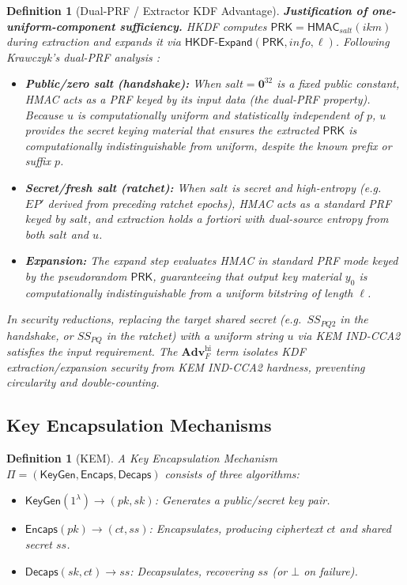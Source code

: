 \documentclass[11pt,a4paper]{article}
\newtheorem{definition}[theorem]{Definition}
\theoremstyle{remark}
\theoremstyle{plain}
\newcommand{\Adv}{\mathbf{Adv}}
\newcommand{\Encaps}{\mathsf{Encaps}}
\newcommand{\Decaps}{\mathsf{Decaps}}
\newcommand{\KeyGen}{\mathsf{KeyGen}}
\begin{document}
\begin{definition}[Dual-PRF / Extractor KDF Advantage]
\noindent\textbf{Justification of one-uniform-component sufficiency.}  HKDF computes
$\mathsf{PRK} = \mathsf{HMAC}_{salt}(ikm)$ during extraction and expands it via
$\mathsf{HKDF\text{-}Expand}(\mathsf{PRK}, info, \ell)$.
Following Krawczyk's dual-PRF analysis \cite{krawczyk2010hkdf}:
\begin{itemize}
  \item \textbf{Public/zero salt (handshake):} When $salt = \mathbf{0}^{32}$ is a fixed public
        constant, HMAC acts as a PRF keyed by its input data (the dual-PRF property).  Because
        $u$ is computationally uniform and statistically independent of $p$, $u$ provides the
        secret keying material that ensures the extracted $\mathsf{PRK}$ is computationally
        indistinguishable from uniform, despite the known prefix or suffix $p$.
  \item \textbf{Secret/fresh salt (ratchet):} When $salt$ is secret and high-entropy (e.g.\ $EP'$
        derived from preceding ratchet epochs), HMAC acts as a standard PRF keyed by $salt$,
        and extraction holds \emph{a fortiori} with dual-source entropy from both $salt$ and $u$.
  \item \textbf{Expansion:} The expand step evaluates HMAC in standard PRF mode keyed by the
        pseudorandom $\mathsf{PRK}$, guaranteeing that output key material $y_0$ is computationally
        indistinguishable from a uniform bitstring of length $\ell$.
\end{itemize}
In security reductions, replacing the target shared secret (e.g.\ $SS_{PQ2}$ in the handshake, or
$SS_{PQ}$ in the ratchet) with a uniform string $u$ via KEM IND-CCA2 satisfies the input requirement.
The $\Adv^{\mathrm{hi}}_{F}$ term isolates KDF extraction/expansion security from KEM IND-CCA2
hardness, preventing circularity and double-counting.
\end{definition}

\subsection{Key Encapsulation Mechanisms}

\begin{definition}[KEM]
A Key Encapsulation Mechanism $\Pi = (\KeyGen, \Encaps, \Decaps)$ consists of three algorithms:
\begin{itemize}
  \item $\KeyGen(1^\lambda) \to (pk, sk)$: Generates a public/secret key pair.
  \item $\Encaps(pk) \to (ct, ss)$: Encapsulates, producing ciphertext $ct$ and shared secret $ss$.
  \item $\Decaps(sk, ct) \to ss$: Decapsulates, recovering $ss$ (or $\bot$ on failure).
\end{itemize}
\end{definition}
\end{document}
